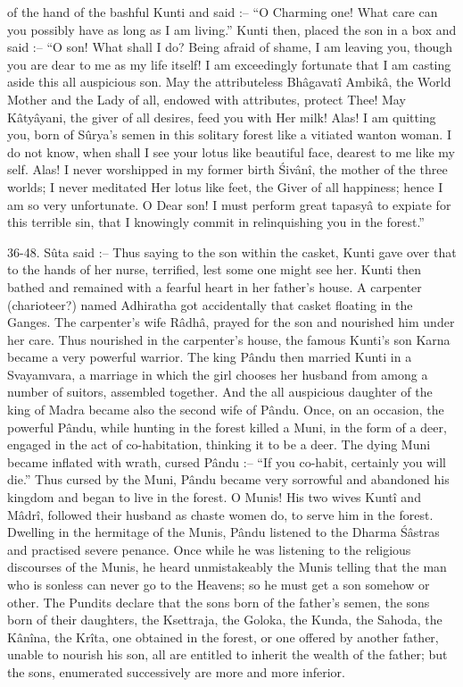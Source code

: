 of the hand of the bashful Kunti and said :-- ``O Charming one! What care can you possibly have as            long as I am living.'' Kunti then, placed the son in a box and said :-- ``O son! What shall I do? Being afraid of shame, I am leaving you, though you are dear to me as my life itself! I am exceedingly fortunate that I am casting aside this all auspicious son. May the attributeless Bh\^agavat\^i Ambik\^a, the World Mother and the Lady of all, endowed with attributes, protect Thee! May K\^aty\^ayani, the giver of all desires, feed you with Her milk! Alas! I am quitting you, born of S\^urya's semen in this solitary forest like a vitiated wanton woman. I do not know, when shall I see your lotus like beautiful face, dearest to me like my self. Alas! I never worshipped in my former birth \'Siv\^an\^i, the mother of the three worlds; I never meditated Her lotus like feet, the Giver of all happiness; hence I am so very unfortunate. O Dear son! I must perform great tapasy\^a to expiate for this terrible sin, that I knowingly commit in relinquishing you in the forest.''

36-48. S\^uta said :-- Thus saying to the son within the casket, Kunti gave over that to the hands of her nurse, terrified, lest some one might see her. Kunti then bathed and remained with a fearful heart in her father's house. A carpenter (charioteer?) named Adhiratha got accidentally that casket floating in the Ganges. The carpenter's wife R\^adh\^a, prayed for the son and nourished him under her care. Thus nourished in the carpenter's house, the famous Kunti's son Karna became a very powerful warrior. The king P\^andu then married Kunti in a Svayamvara, a marriage in which the girl chooses her husband from among a number of suitors, assembled together. And the all auspicious daughter of the king of Madra became also the second wife of P\^andu. Once, on an occasion, the powerful P\^andu, while hunting in the forest killed a Muni, in the form of a deer, engaged in the act of co-habitation, thinking it to be a deer. The dying Muni became inflated with wrath, cursed P\^andu :-- ``If you co-habit, certainly you will die.'' Thus cursed by the Muni, P\^andu became very sorrowful and abandoned his kingdom and began to live in the forest. O Munis! His two wives Kunt\^i and M\^adr\^i, followed their husband as chaste women do, to serve him in the forest. Dwelling in the hermitage of the Munis, P\^andu listened to the Dharma \'S\^astras and practised severe penance. Once while he was listening to the religious discourses of the Munis, he heard unmistakeably the Munis telling that the man who is sonless can never go to the Heavens; so he must get a son somehow or other. The Pundits declare that the sons born of the father's semen, the sons born of their daughters, the Ksettraja, the Goloka, the Kunda, the Sahoda, the K\^an\^ina, the Kr\^ita\footnotemark, one obtained in the forest, or one offered by another father, unable to nourish his son, all are entitled to inherit the wealth of the father; but the sons, enumerated successively are more and more inferior.

